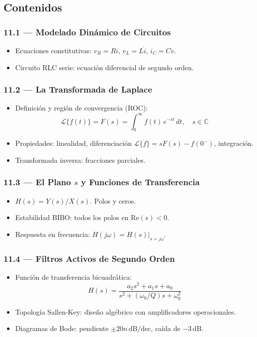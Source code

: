 \documentclass[11pt, letterpaper]{article}
\begin{document}
\subsection{Contenidos}

\subsubsection{11.1 --- Modelado Din\'amico de Circuitos}
\begin{itemize}
  \item Ecuaciones constitutivas: $v_R=Ri$, $v_L=L\dot{i}$, $i_C=C\dot{v}$.
  \item Circuito RLC serie: ecuaci\'on diferencial de segundo orden.
\end{itemize}

\subsubsection{11.2 --- La Transformada de Laplace}
\begin{itemize}
  \item Definici\'on y regi\'on de convergencia (ROC):
    \[\mathcal{L}\{f(t)\}=F(s)=\int_0^\infty f(t)\,e^{-st}\,dt,\quad s\in\mathbb{C}\]
  \item Propiedades: linealidad, diferenciaci\'on $\mathcal{L}\{\dot{f}\}=sF(s)-f(0^-)$, integraci\'on.
  \item Transformada inversa: fracciones parciales.
\end{itemize}

\subsubsection{11.3 --- El Plano $s$ y Funciones de Transferencia}
\begin{itemize}
  \item $H(s)=Y(s)/X(s)$. Polos y ceros.
  \item Estabilidad BIBO: todos los polos en $\text{Re}(s)<0$.
  \item Respuesta en frecuencia: $H(j\omega)=H(s)|_{s=j\omega}$.
\end{itemize}

\subsubsection{11.4 --- Filtros Activos de Segundo Orden}
\begin{itemize}
  \item Funci\'on de transferencia bicuadr\'atica:
    \[H(s)=\frac{a_2s^2+a_1s+a_0}{s^2+(\omega_0/Q)s+\omega_0^2}\]
  \item Topolog\'ia Sallen-Key: dise\~no alg\'ebrico con amplificadores operacionales.
  \item Diagramas de Bode: pendiente $\pm 20n\,\text{dB/dec}$, ca\'ida de $-3\,\text{dB}$.
\end{itemize}
\end{document}
